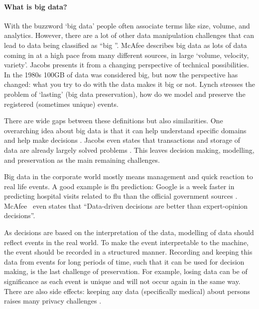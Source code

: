 \paragraph{What is big data?}
With the buzzword `big data' people often associate terms like size, volume, and analytics.
However, there are a lot of other data manipulation challenges that can lead to data being classified as ``big ''.
McAfee \cite{dsb1mcafee} describes big data as lots of data coming in at a high pace from many different sources, in large `volume, velocity, variety'.
Jacobs \cite{dsb5jacobs} presents it from a changing perspective of technical possibilities.
In the 1980s 100GB of data was considered big, but now the perspective has changed: what you try to do with the data makes it big or not.
Lynch \cite{dsb3lynch} stresses the problem of `lasting' (big data preservation), \ie{} how do we model and preserve the registered (sometimes unique) events.

There are wide gaps between these definitions but also similarities.
One overarching idea about big data is that it can help understand specific domains and help make decisions \cite{dsb2lohr}.
Jacobs even states that transactions and storage of data are already largely solved problems \cite{dsb5jacobs}.
This leaves decision making, modelling, and preservation as the main remaining challenges.

Big data in the corporate world mostly means management and quick reaction to real life events.
A good example is flu prediction: Google is a week faster in predicting hospital visits related to flu than the official government sources \cite{dsb8dugas, dsb1mcafee}.
McAfee~\cite{dsb1mcafee} even states that ``Data-driven decisions are better than expert-opinion decisions''.

As decisions are based on the interpretation of the data, modelling of data should reflect events in the real world.
To make the event interpretable to the machine, the event should be recorded in a structured manner.
Recording and keeping this data from events for long periods of time, such that it can be used for decision making, is the last challenge of preservation.
For example, losing data can be of significance as each event is unique and will not occur again in the same way.
There are also side effects: keeping any data (specifically medical) about persons raises many privacy challenges \cite{dsb1mcafee}.

